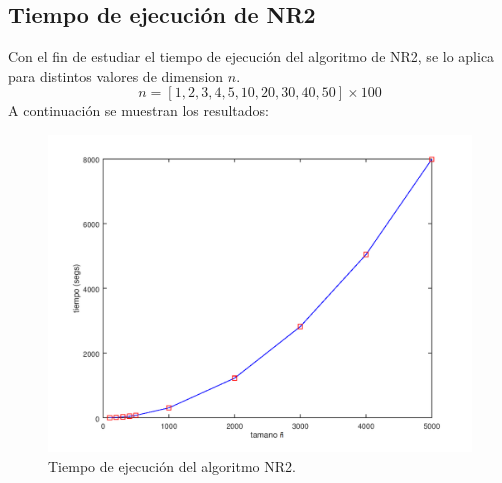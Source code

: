 \subsection{Tiempo de ejecución de NR2}
Con el fin de estudiar el tiempo de ejecución del algoritmo de NR2, se lo aplica para distintos valores de dimension $n$.
\begin{equation*}
    n = [1, 2, 3, 4, 5, 10, 20, 30, 40, 50] \times 100
\end{equation*}
A continuación se muestran los resultados:
\begin{figure}[h!]
    \includegraphics[width=\linewidth]{Grafica_5_3_1.png}
    \caption{Tiempo de ejecución del algoritmo NR2.}
    \label{fig:Grafica_5_3_1}
\end{figure}

